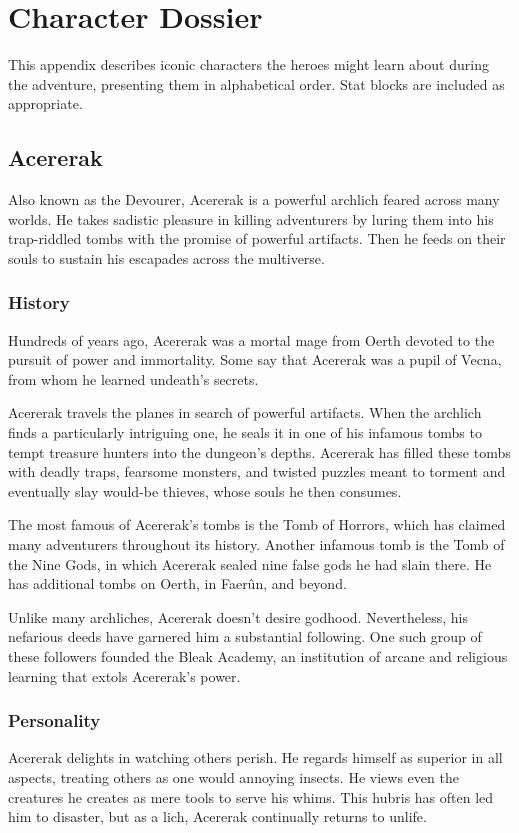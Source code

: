 \documentclass[10pt,a4paper,twoside,bg=print,twocolumn,openany,nodeprecatedcode]{dndbook}
\begin{document}
\chapter{Character Dossier}
This appendix describes iconic characters the heroes might learn about during the adventure, presenting them in alphabetical order. Stat blocks are included as appropriate.

\section{Acererak}
Also known as the Devourer, Acererak is a powerful archlich feared across many worlds. He takes sadistic pleasure in killing adventurers by luring them into his trap-riddled tombs with the promise of powerful artifacts. Then he feeds on their souls to sustain his escapades across the multiverse.

\subsection{History}
Hundreds of years ago, Acererak was a mortal mage from Oerth devoted to the pursuit of power and immortality. Some say that Acererak was a pupil of Vecna, from whom he learned undeath's secrets.

Acererak travels the planes in search of powerful artifacts. When the archlich finds a particularly intriguing one, he seals it in one of his infamous tombs to tempt treasure hunters into the dungeon's depths. Acererak has filled these tombs with deadly traps, fearsome monsters, and twisted puzzles meant to torment and eventually slay would-be thieves, whose souls he then consumes.

The most famous of Acererak's tombs is the Tomb of Horrors, which has claimed many adventurers throughout its history. Another infamous tomb is the Tomb of the Nine Gods, in which Acererak sealed nine false gods he had slain there. He has additional tombs on Oerth, in Faerûn, and beyond.

Unlike many archliches, Acererak doesn't desire godhood. Nevertheless, his nefarious deeds have garnered him a substantial following. One such group of these followers founded the Bleak Academy, an institution of arcane and religious learning that extols Acererak's power.

\subsection{Personality}
Acererak delights in watching others perish. He regards himself as superior in all aspects, treating others as one would annoying insects. He views even the creatures he creates as mere tools to serve his whims. This hubris has often led him to disaster, but as a lich, Acererak continually returns to unlife.
\end{document}
